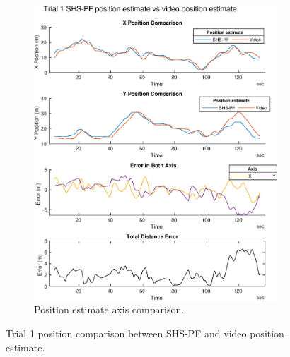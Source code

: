 \begin{figure}[H]
\begin{subfigure}[t]{.45\textwidth}
		\includegraphics[width=\linewidth]{images/20201129_1946_trial_1_traj_1}
		\caption{Position estimate axis comparison.}
		\label{fig:shspf_trial1_comparison}
	\end{subfigure}
	\caption{Trial 1 position comparison between SHS-PF and video position estimate.}
	\label{fig:shspf_trial1_shs_gt_comparison}
\end{figure}
